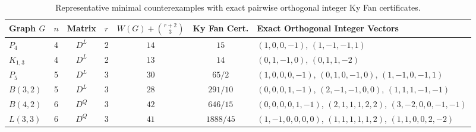 \documentclass[11pt,a4paper]{article}
\theoremstyle{remark}
\begin{document}
\begin{table}[!htbp]
\centering
\caption{Representative minimal counterexamples with exact pairwise orthogonal integer Ky Fan certificates.}
\label{tab:minimal}
\begin{tabularx}{\linewidth}{lcccccX}
\toprule
Graph $G$ & $n$ & Matrix & $r$ & $W(G)+\binom{r+2}{3}$ & Ky Fan Cert. & Exact Orthogonal Integer Vectors \\
\midrule
$P_4$ & 4 & $D^L$ & 2 & $14$ & $15$ & $(1,0,0,-1)$, $(1,-1,-1,1)$ \\
$K_{1,3}$ & 4 & $D^L$ & 2 & $13$ & $14$ & $(0,1,-1,0)$, $(0,1,1,-2)$ \\
$P_5$ & 5 & $D^L$ & 3 & $30$ & $65/2$ & $(1,0,0,0,-1)$, $(0,1,0,-1,0)$, $(1,-1,0,-1,1)$ \\
$B(3,2)$ & 5 & $D^L$ & 3 & $28$ & $291/10$ & $(0,0,0,1,-1)$, $(2,-1,-1,0,0)$, $(1,1,1,-1,-1)$ \\
$B(4,2)$ & 6 & $D^Q$ & 3 & $42$ & $646/15$ & $(0,0,0,0,1,-1)$, $(2,1,1,1,2,2)$, $(3,-2,0,0,-1,-1)$ \\
$L(3,3)$ & 6 & $D^Q$ & 3 & $41$ & $1888/45$ & $(1,-1,0,0,0,0)$, $(1,1,1,1,1,2)$, $(1,1,0,0,2,-2)$ \\
\bottomrule
\end{tabularx}
\end{table}
\end{document}
